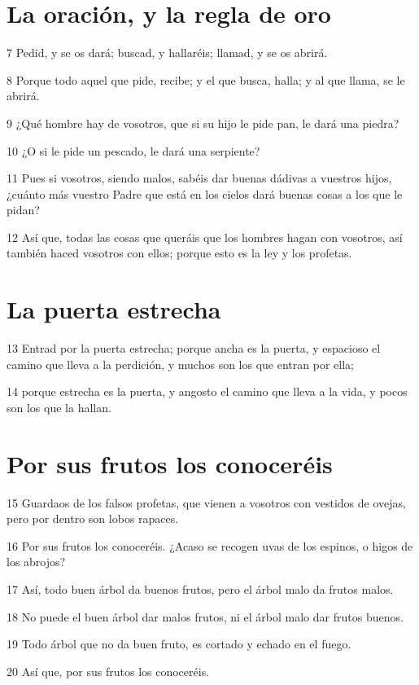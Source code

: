 \section*{La oración, y la regla de oro}

\par 7 Pedid, y se os dará; buscad, y hallaréis; llamad, y se os abrirá.
\par 8 Porque todo aquel que pide, recibe; y el que busca, halla; y al que llama, se le abrirá.
\par 9 ¿Qué hombre hay de vosotros, que si su hijo le pide pan, le dará una piedra?
\par 10 ¿O si le pide un pescado, le dará una serpiente?
\par 11 Pues si vosotros, siendo malos, sabéis dar buenas dádivas a vuestros hijos, ¿cuánto más vuestro Padre que está en los cielos dará buenas cosas a los que le pidan?
\par 12 Así que, todas las cosas que queráis que los hombres hagan con vosotros, así también haced vosotros con ellos; porque esto es la ley y los profetas.

\section*{La puerta estrecha}

\par 13 Entrad por la puerta estrecha; porque ancha es la puerta, y espacioso el camino que lleva a la perdición, y muchos son los que entran por ella;
\par 14 porque estrecha es la puerta, y angosto el camino que lleva a la vida, y pocos son los que la hallan.

\section*{Por sus frutos los conoceréis}

\par 15 Guardaos de los falsos profetas, que vienen a vosotros con vestidos de ovejas, pero por dentro son lobos rapaces.
\par 16 Por sus frutos los conoceréis. ¿Acaso se recogen uvas de los espinos, o higos de los abrojos?
\par 17 Así, todo buen árbol da buenos frutos, pero el árbol malo da frutos malos.
\par 18 No puede el buen árbol dar malos frutos, ni el árbol malo dar frutos buenos.
\par 19 Todo árbol que no da buen fruto, es cortado y echado en el fuego.
\par 20 Así que, por sus frutos los conoceréis.


